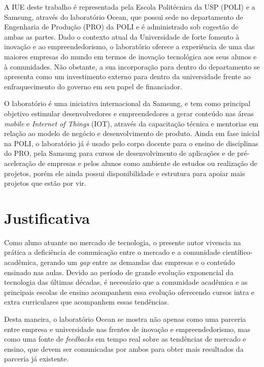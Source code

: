 A IUE deste trabalho é representada pela Escola Politécnica da USP (POLI) e a Samsung, através do laboratório Ocean, que possui sede no departamento de Engenharia de Produção (PRO) da POLI e é administrado sob cogestão de ambas as partes. Dado o contexto atual da Universidade de forte fomento à inovação e ao empreendedorismo, o laboratório oferece a experiência de uma das maiores empresas do mundo em termos de inovação tecnológica aos seus alunos e à comunidades. Não obstante, a sua incorporação para dentro do departamento se apresenta como um investimento externo para dentro da universidade frente ao enfraquecimento do governo em seu papel de financiador.

O laboratório é uma iniciativa internacional da Samsung, e tem como principal objetivo estimular desenvolvedores e empreendedores a gerar conteúdo nas áreas \textit{mobile} e \textit{Internet of Things} (IOT), através da capacitação técnica e mentorias em relação ao modelo de negócio e desenvolvimento de produto. Ainda em fase inicial na POLI, o laboratório já é usado pelo corpo docente para o ensino de disciplinas do PRO, pela Samsung para cursos de desenvolvimento de aplicações e de pré-aceleração de empresas e pelos alunos como ambiente de estudos ou realização de projetos, porém ele ainda possui disponibilidade e estrutura para apoiar mais projetos que estão por vir.

\section{Justificativa}
\label{cha:justificativa}

Como aluno atuante no mercado de tecnologia, o presente autor vivencia na prática a deficiência de comunicação entre o mercado e a comunidade científico-acadêmica, gerando um \textit{gap} entre as demandas das empresas e o conteúdo ensinado nas aulas. Devido ao período de grande evolução exponencial da tecnologia das últimas décadas, é necessário que a comunidade acadêmica e as principais escolas de ensino acompanhem essa evolução oferecendo cursos intra e extra curriculares que acompanhem essas tendências.

Desta maneira, o laboratório Ocean se mostra não apenas como uma parceria entre empresa e universidade nas frentes de inovação e empreendedorismo, mas como uma fonte de \textit{feedbacks} em tempo real sobre as tendências de mercado e ensino, que devem ser comunicadas por ambos para obter mais resultados da parceria já existente.

